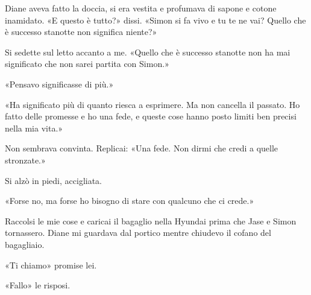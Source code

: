 Diane aveva fatto la doccia, si era vestita e profumava di sapone e
cotone inamidato. «E questo è tutto?» dissi. «Simon si fa vivo e tu te
ne vai? Quello che è successo stanotte non significa niente?»

Si sedette sul letto accanto a me. «Quello che è successo stanotte non
ha mai significato che non sarei partita con Simon.»

«Pensavo significasse di più.»

«Ha significato più di quanto riesca a esprimere. Ma non cancella il
passato. Ho fatto delle promesse e ho una fede, e queste cose hanno
posto limiti ben precisi nella mia vita.»

Non sembrava convinta. Replicai: «Una fede. Non dirmi che credi a quelle
stronzate.»

Si alzò in piedi, accigliata.

«Forse no, ma forse ho bisogno di stare con qualcuno che ci crede.»

\separatorefiori

Raccolsi le mie cose e caricai il bagaglio nella Hyundai prima che Jase
e Simon tornassero. Diane mi guardava dal portico mentre chiudevo il
cofano del bagagliaio.

«Ti chiamo» promise lei.

«Fallo» le risposi.